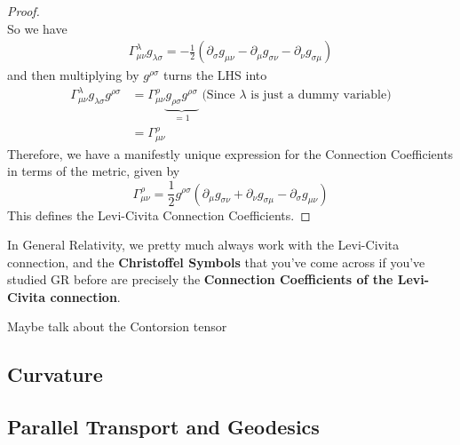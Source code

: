 \documentclass[11pt]{article}
\begin{document}
\begin{proof}
  \\
  So we have 
  \begin{align*}
    \Gamma_{\mu \nu}^{\lambda} g_{\lambda \sigma} = -\frac{1}{2}\left( \partial_{\sigma} g_{\mu \nu} -  \partial_{\mu} g_{\sigma \nu} - \partial_{\nu} g_{\sigma \mu} \right) 
  \end{align*}
  and then multiplying by $g^{\rho \sigma}$ turns the LHS into
  \begin{align*}
    \Gamma_{\mu \nu}^{\lambda} g_{\lambda \sigma} g^{\rho \sigma} &= \Gamma_{\mu \nu}^{\rho} \underbrace{g_{\rho \sigma} g^{\rho \sigma}}_{=1} \text{ (Since $\lambda$ is just a dummy variable)} \\
    &= \Gamma_{\mu \nu}^{\rho}
  \end{align*}
  Therefore, we have a manifestly unique expression for the Connection Coefficients in terms of the metric, given by 
  \[ \boxed{ \Gamma_{\mu \nu}^{\rho} = \frac{1}{2} g^{\rho \sigma}\left(\partial_{\mu} g_{\sigma \nu} + \partial_{\nu} g_{\sigma \mu} -  \partial_{\sigma} g_{\mu \nu} \right)  } \]
  This defines the Levi-Civita Connection Coefficients.
\end{proof}

\begin{dottedbox}
  In General Relativity, we pretty much always work with the Levi-Civita connection, and the \textbf{Christoffel Symbols} that you've come across if you've studied GR before are precisely the \textbf{Connection Coefficients of the Levi-Civita connection}.
\end{dottedbox}

\begin{note}
  {Maybe talk about the Contorsion tensor}
\end{note}



\subsection{Curvature}

\subsection{Parallel Transport and Geodesics}



\end{document}
